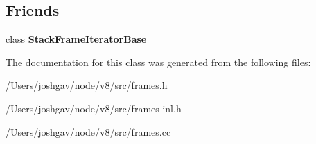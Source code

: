 \subsection*{Friends}
\begin{DoxyCompactItemize}
\item 
class {\bfseries Stack\+Frame\+Iterator\+Base}\hypertarget{classv8_1_1internal_1_1_entry_frame_ac7310421866976ca454bbe11c5f926c3}{}\label{classv8_1_1internal_1_1_entry_frame_ac7310421866976ca454bbe11c5f926c3}

\end{DoxyCompactItemize}


The documentation for this class was generated from the following files\+:\begin{DoxyCompactItemize}
\item 
/\+Users/joshgav/node/v8/src/frames.\+h\item 
/\+Users/joshgav/node/v8/src/frames-\/inl.\+h\item 
/\+Users/joshgav/node/v8/src/frames.\+cc\end{DoxyCompactItemize}
